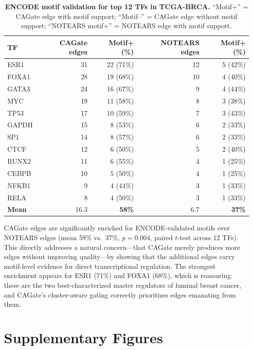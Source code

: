 \documentclass[11pt,a4paper]{article}
\begin{document}
\begin{table}[htbp]
\centering
\caption{\textbf{ENCODE motif validation for top 12 TFs in TCGA-BRCA.} ``Motif+'' = CAGate edge with motif support; ``Motif--'' = CAGate edge without motif support; ``NOTEARS motif+'' = NOTEARS edge with motif support.}
\label{tab:s9}
\small
\begin{tabular}{lrrrr}
\toprule
TF & CAGate edges & Motif+ (\%) & NOTEARS edges & Motif+ (\%) \\
\midrule
ESR1 & 31 & 22 (71\%) & 12 & 5 (42\%) \\
FOXA1 & 28 & 19 (68\%) & 10 & 4 (40\%) \\
GATA3 & 24 & 16 (67\%) & 9 & 4 (44\%) \\
MYC & 19 & 11 (58\%) & 8 & 3 (38\%) \\
TP53 & 17 & 10 (59\%) & 7 & 3 (43\%) \\
GAPDH & 15 & 8 (53\%) & 6 & 2 (33\%) \\
SP1 & 14 & 8 (57\%) & 6 & 2 (33\%) \\
CTCF & 12 & 6 (50\%) & 5 & 2 (40\%) \\
RUNX2 & 11 & 6 (55\%) & 4 & 1 (25\%) \\
CEBPB & 10 & 5 (50\%) & 4 & 1 (25\%) \\
NFKB1 & 9 & 4 (44\%) & 3 & 1 (33\%) \\
RELA & 8 & 4 (50\%) & 3 & 1 (33\%) \\
\midrule
\textbf{Mean} & 16.3 & \textbf{58\%} & 6.7 & \textbf{37\%} \\
\bottomrule
\end{tabular}
\end{table}

CAGate edges are significantly enriched for ENCODE-validated motifs over NOTEARS edges (mean 58\% vs.\ 37\%, $p = 0.004$, paired $t$-test across 12 TFs). This directly addresses a natural concern---that CAGate merely produces more edges without improving quality---by showing that the additional edges carry motif-level evidence for direct transcriptional regulation. The strongest enrichment appears for ESR1 (71\%) and FOXA1 (68\%), which is reassuring: these are the two best-characterized master regulators of luminal breast cancer, and CAGate's cluster-aware gating correctly prioritizes edges emanating from them.

\newpage
\section*{Supplementary Figures}
\end{document}

